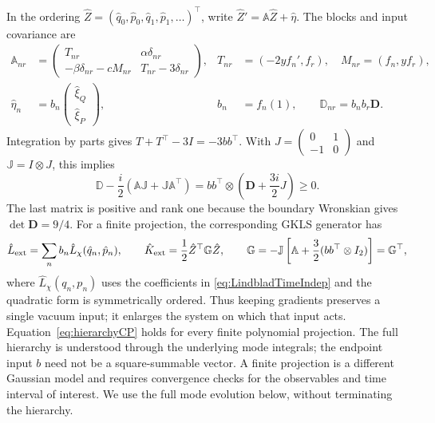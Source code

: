 \documentclass{article}
\numberwithin{equation}{section}
\begin{document}
In the ordering $\hat Z=(\hat q_0,\hat p_0,\hat q_1,\hat p_1,\ldots)^\top$, write $\hat Z'=\mathbb A\hat Z+\hat\eta$. The blocks and input covariance are
\begin{subequations}\label{eq:canonicalHierarchy}
\begin{align}
 \mathbb A_{nr}&=
 \begin{pmatrix}
 T_{nr}&\alpha\delta_{nr}\\
 -\beta\delta_{nr}-cM_{nr}&T_{nr}-3\delta_{nr}
 \end{pmatrix},
 &T_{nr}&=(-2yf_n',f_r),\quad M_{nr}=(f_n,yf_r),\\
 \hat\eta_n&=b_n\begin{pmatrix}\hat\xi_Q\\\hat\xi_P\end{pmatrix},
 &b_n&=f_n(1),\qquad \mathbb D_{nr}=b_nb_r\mathbf D.
\end{align}
\end{subequations}
Integration by parts gives $T+T^\top-3I=-3bb^\top$. With $J=\left(\begin{smallmatrix}0&1\\-1&0\end{smallmatrix}\right)$ and $\mathbb J=I\otimes J$, this implies
\begin{equation}
 \mathbb D-\frac{i}{2}(\mathbb A\mathbb J+\mathbb J\mathbb A^\top)
 =bb^\top\otimes\left(\mathbf D+\frac{3i}{2}J\right)\geq0.
 \label{eq:hierarchyCP}
\end{equation}
The last matrix is positive and rank one because the boundary Wronskian gives $\det\mathbf D=9/4$. For a finite projection, the corresponding GKLS generator has
\begin{equation}
 \hat L_{\rm ext}=\sum_n b_n\hat L_\chi(\hat q_n,\hat p_n),\qquad
 \hat K_{\rm ext}=\frac12\hat Z^\top\mathbb G\hat Z,\qquad
 \mathbb G=-\mathbb J\left[\mathbb A+\frac32(bb^\top\otimes I_2)\right]
 =\mathbb G^\top,
 \label{eq:hierarchyGKLS}
\end{equation}
where $\hat L_\chi(q_n,p_n)$ uses the coefficients in \cref{eq:LindbladTimeIndep} and the quadratic form is symmetrically ordered. Thus keeping gradients preserves a single vacuum input; it enlarges the system on which that input acts. Equation~\eqref{eq:hierarchyCP} holds for every finite polynomial projection. The full hierarchy is understood through the underlying mode integrals; the endpoint input $b$ need not be a square-summable vector. A finite projection is a different Gaussian model and requires convergence checks for the observables and time interval of interest. We use the full mode evolution below, without terminating the hierarchy.
\end{document}
